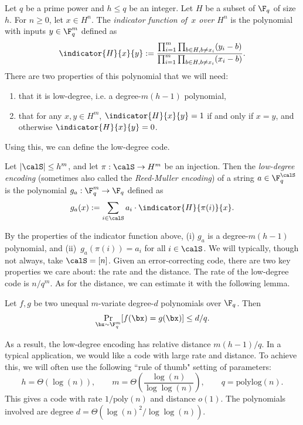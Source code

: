 Let $q$ be a prime power and $h\leq q$ be an integer.  
Let $H$ be a subset of $\F_q$ of size~$h$.
For $n \geq 0$, let $x \in H^n$.
The \emph{indicator function of~$x$ over $H^n$}
is the polynomial with inputs $y \in \F_q^m$ defined as
\begin{equation*}
\indicator{H}{x}{y} := \frac{\prod_{i=1}^m \prod_{b \in H, b \neq x_i}
  (y_i - b)}{\prod_{i=1}^m \prod_{b \in H, b \neq x_i} (x_i - b)}.
\end{equation*}
There are two properties of this polynomial that we will need:
\begin{enumerate}
\itemsep -.5pt
\item[(i)] that it is low-degree, i.e. a degree-$m(h-1)$ polynomial,
\item[(ii)] that for any $x, y \in H^m$, $\indicator{H}{x}{y} = 1$ if and only if $x = y$,
and otherwise $\indicator{H}{x}{y}= 0$.
\end{enumerate}
Using this, we can define the low-degree code.

\begin{definition}
Let $|\calS| \leq h^m$, and let $\pi:\calS \rightarrow H^m$ be an injection.
Then the \emph{low-degree encoding} (sometimes also called the \emph{Reed-Muller encoding})
of a string $a \in \F_q^{\calS}$ is the polynomial $g_a :\F_q^m \rightarrow \F_q$ defined as
\begin{equation*}
g_a(x) := \sum_{i\in\calS} a_i \cdot \indicator{H}{\pi(i)}{x}.
\end{equation*}
\end{definition}
By the properties of the indicator function above,
(i) $g_a$ is a degree-$m(h-1)$ polynomial,
and (ii)~$g_a(\pi(i)) = a_i$ for all $i \in \calS$.
We will typically, though not always, take $\calS = [n]$.
Given an error-correcting code, there are two key properties we care about:
the rate and the distance.
The rate of the low-degree code is $n / q^m$.
As for the distance, we can estimate it with the following lemma.

\begin{lemma}\label{lem:schwartz-zippel}
Let $f, g$ be two unequal $m$-variate degree-$d$ polynomials over $\F_q$. Then
\begin{equation*}
\Pr_{\bx \sim \F_q^m}[f(\bx) = g(\bx)] \leq d/q.
\end{equation*}
\end{lemma}
As a result, the low-degree encoding has relative distance $m(h-1) / q$.
In a typical application, we would like a code with large rate and distance.
To achieve this, we will often use the following ``rule of thumb" setting of parameters:
\begin{equation}\label{eq:parameters}
h = \Theta(\log(n)),
\qquad
m = \Theta\left(\frac{\log(n)}{\log\log(n)}\right),
\qquad
q = \mathrm{polylog}(n).
\end{equation}
This gives a code with rate $1/\mathrm{poly}(n)$ and distance $o(1)$.
The polynomials involved are degree $d = \Theta(\log(n)^2/\log\log(n))$.

